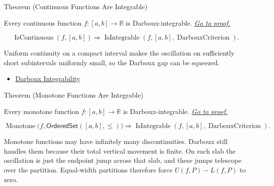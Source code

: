 \begin{theorembox}{Theorem (Continuous Functions Are Integrable)}
\begin{theorem}
\label{thm:continuous-darboux-integrable}
Every continuous function \(f:[a,b]\to\mathbb R\) is Darboux-integrable.
\hyperref[prf:continuous-darboux-integrable]{\textit{Go to proof.}}
\end{theorem}
\end{theorembox}

\begin{remark*}
\[
\operatorname{IsContinuous}(f,[a,b])
\Longrightarrow
\operatorname{IsIntegrable}(f,[a,b],\operatorname{DarbouxCriterion}).
\]
\end{remark*}

\begin{remark*}[Interpretation]
Uniform continuity on a compact interval makes the oscillation on sufficiently
short subintervals uniformly small, so the Darboux gap can be squeezed.
\end{remark*}

\begin{dependencies}
\begin{itemize}
  \item \hyperref[def:darboux-integrability]{Darboux Integrability}
\end{itemize}
\end{dependencies}

\begin{theorembox}{Theorem (Monotone Functions Are Integrable)}
\begin{theorem}
\label{thm:monotone-darboux-integrable}
Every monotone function \(f:[a,b]\to\mathbb R\) is Darboux-integrable.
\hyperref[prf:monotone-darboux-integrable]{\textit{Go to proof.}}
\end{theorem}
\end{theorembox}

\begin{remark*}
\[
\operatorname{Monotone}\bigl(f,\mathsf{OrderedSet}([a,b],\leq)\bigr)
\Longrightarrow
\operatorname{IsIntegrable}(f,[a,b],\operatorname{DarbouxCriterion}).
\]
\end{remark*}

\begin{remark*}[Interpretation]
Monotone functions may have infinitely many discontinuities. Darboux still
handles them because their total vertical movement is finite. On each slab
the oscillation is just the endpoint jump across that slab, and these jumps
telescope over the partition. Equal-width partitions therefore force
\(U(f,P)-L(f,P)\) to zero.
\end{remark*}

